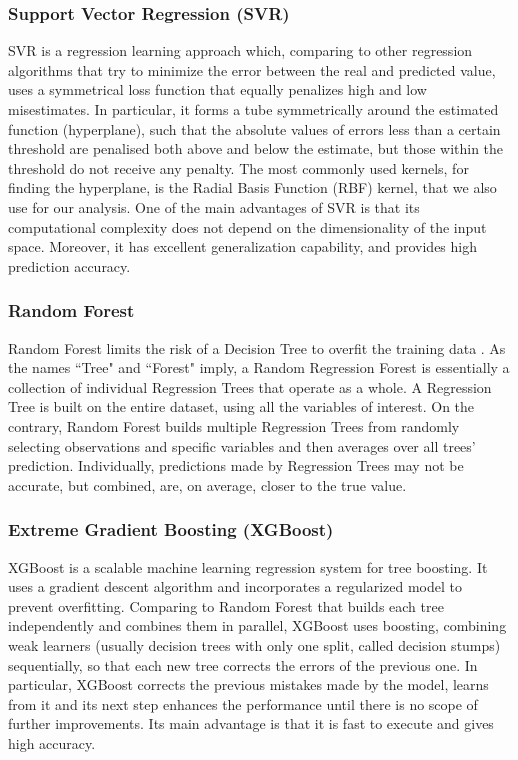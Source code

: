 \documentclass{bmcart}
\begin{document}
\subsubsection*{\textbf{Support Vector Regression (SVR)}}

SVR \cite{awad2015support} is a regression learning approach which, comparing to other regression algorithms that try to minimize the error between the real and predicted value, uses a symmetrical loss function that equally penalizes high and low misestimates. In particular, it forms a tube symmetrically around the estimated function (hyperplane), such that the absolute values of errors less than a certain threshold are penalised both above and below the estimate, but those within the threshold do not receive any penalty. The most commonly used kernels, for finding the hyperplane, is the Radial Basis Function (RBF) kernel, that we also use for our analysis. One of the main advantages of SVR is that its computational complexity does not depend on the dimensionality of the input space. Moreover, it has excellent generalization capability, and provides high prediction accuracy.

\subsubsection*{\textbf{Random Forest}}
Random Forest limits the risk of a Decision Tree to overfit the training data \cite{hastie2009elements}. As the names ``Tree" and ``Forest" imply, a Random Regression Forest is essentially a collection of individual Regression Trees that operate as a whole. A Regression Tree is built on the entire dataset, using all the variables of interest. On the contrary, Random Forest builds multiple Regression Trees from randomly selecting observations and specific variables and then averages over all trees' prediction. Individually, predictions made by Regression Trees may not be accurate, but combined, are, on average, closer to the true value.

\subsubsection*{\textbf{Extreme Gradient Boosting (XGBoost)}}
XGBoost \cite{chen2016xgboost} is a scalable machine
learning regression system for tree boosting. 
It uses a gradient descent algorithm and incorporates a regularized model to prevent overfitting. Comparing to Random Forest that builds each tree independently and combines them in parallel, XGBoost uses boosting, combining weak learners (usually decision trees with only one split, called decision stumps) sequentially, so that each new tree corrects the errors of the previous one. In particular, XGBoost corrects the previous mistakes made by the model, learns from it and its next step enhances the performance until there is no scope of further improvements. Its main advantage is that it is fast to execute and gives high accuracy.
\end{document}
